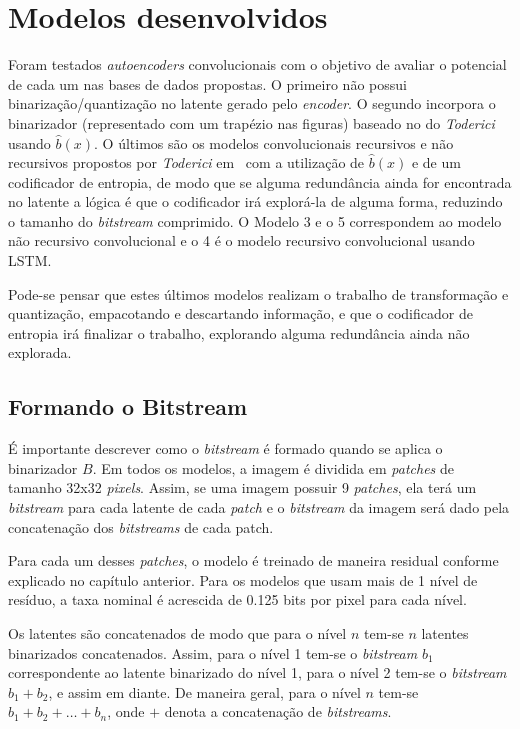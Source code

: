 \section{Modelos desenvolvidos}
Foram testados \textit{autoencoders} convolucionais com o objetivo de avaliar o potencial de cada um nas bases de dados propostas. O primeiro não possui binarização/quantização no latente gerado pelo \textit{encoder}. O segundo incorpora o binarizador (representado com um trapézio nas figuras) baseado no do \textit{Toderici} usando $\hat{b}(x)$. O últimos são os modelos convolucionais recursivos e não recursivos propostos por \textit{Toderici} em~\cite{Variable2016Toderici} com a utilização de $\hat{b}(x)$ e de um codificador de entropia, de modo que se alguma redundância ainda for encontrada no latente a lógica é que o codificador irá explorá-la de alguma forma, reduzindo o tamanho do \textit{bitstream} comprimido. O Modelo 3 e o 5 correspondem ao modelo não recursivo convolucional e o 4 é o modelo recursivo convolucional usando LSTM.

Pode-se pensar que estes últimos modelos realizam o trabalho de transformação e quantização, empacotando e descartando informação, e que o codificador de entropia irá finalizar o trabalho, explorando alguma redundância ainda não explorada.

\subsection{Formando o Bitstream}
É importante descrever como o \textit{bitstream} é formado quando se aplica o binarizador $B$. Em todos os modelos, a imagem é dividida em \textit{patches} de tamanho 32x32 \textit{pixels}. Assim, se uma imagem possuir 9 \textit{patches}, ela terá um \textit{bitstream} para cada latente de cada \textit{patch} e o \textit{bitstream} da imagem será dado pela concatenação dos \textit{bitstreams} de cada patch. 

Para cada um desses \textit{patches}, o modelo é treinado de maneira residual conforme explicado no capítulo anterior. Para os modelos que usam mais de 1 nível de resíduo, a taxa nominal é acrescida de 0.125 bits por pixel para cada nível. 

Os latentes são concatenados de modo que para o nível $n$ tem-se $n$ latentes binarizados concatenados. Assim, para o nível 1 tem-se o \textit{bitstream} $b_1$ correspondente ao latente binarizado do nível 1, para o nível 2 tem-se o \textit{bitstream} $b_1 + b_2$, e assim em diante. De maneira geral, para o nível $n$ tem-se $b_1 + b_2 + \dots + b_n$, onde $+$ denota a concatenação de \textit{bitstreams}. 

